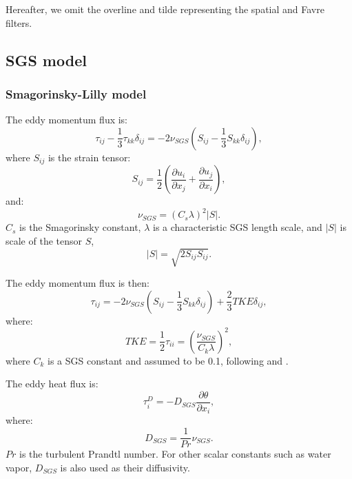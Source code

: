 Hereafter, we omit the overline and tilde representing the spatial and Favre filters.

\subsection{SGS model}
\subsubsection{Smagorinsky-Lilly model}
The eddy momentum flux is:
\begin{equation}
  \tau_{ij} - \frac{1}{3}\tau_{kk}\delta_{ij} = -2\nu_{SGS}\left(S_{ij}-\frac{1}{3}S_{kk}\delta_{ij}\right),
\end{equation}
where $S_{ij}$ is the strain tensor:
\begin{equation}
  S_{ij} = \frac{1}{2}\left(\frac{\partial u_i}{\partial x_j} + \frac{\partial u_j}{\partial x_i}\right),
  \label{eq:strain tensor}
\end{equation}
and:
\begin{equation}
  \nu_{SGS} = \left(C_s\lambda\right)^2 \left|S\right|.
\end{equation}
$C_s$ is the Smagorinsky constant,
$\lambda$ is a characteristic SGS length scale,
and $\left|S\right|$ is scale of the tensor $S$,
\begin{equation}
  \left|S\right| = \sqrt{2S_{ij}S_{ij}}.
  \label{eq:|S|}
\end{equation}

The eddy momentum flux is then:
\begin{equation}
  \tau_{ij} = -2\nu_{SGS}\left(S_{ij}-\frac{1}{3}S_{kk}\delta_{ij}\right)
             + \frac{2}{3} TKE\delta_{ij},
  \label{eq:tau}
\end{equation}
where:
\begin{equation}
  TKE = \frac{1}{2}\tau_{ii}
   = \left(\frac{\nu_{SGS}}{C_k\lambda}\right)^2,
   \label{eq:tke}
\end{equation}
where $C_k$ is a SGS constant and assumed to be 0.1, following \citet{Deardorff_1980} and \citet{Moeng_Wynggard_1988}.


The eddy heat flux is:
\begin{equation}
  \tau^D_i = -D_{SGS} \frac{\partial \theta}{\partial x_i},
  \label{eq:tau*}
\end{equation}
where:
\begin{equation}
  D_{SGS} = \frac{1}{Pr}\nu_{SGS}.
\end{equation}
$Pr$ is the turbulent Prandtl number.
For other scalar constants such as water vapor,
$D_{SGS}$ is also used as their diffusivity.

